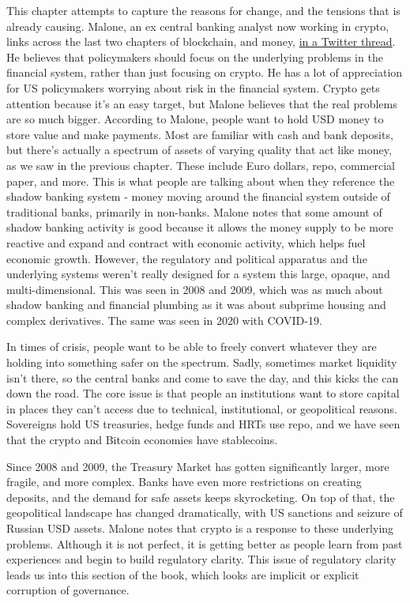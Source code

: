 This chapter attempts to capture the reasons for change, and the tensions that is already causing. Malone, an ex central banking analyst now working in crypto, links across the last two chapters of blockchain, and money, \href{https://twitter.com/brendanpmalone/status/1628067806984937472}{in a Twitter thread}. He believes that policymakers should focus on the underlying problems in the financial system, rather than just focusing on crypto. He has a lot of appreciation for US policymakers worrying about risk in the financial system. Crypto gets  attention because it's an easy target, but Malone believes that the real problems are so much bigger. According to Malone, people want to hold USD money to store value and make payments. Most are familiar with cash and bank deposits, but there's actually a spectrum of assets of varying quality that act like money, as we saw in the previous chapter. These include Euro dollars, repo, commercial paper, and more. This is what people are talking about when they reference the shadow banking system - money moving around the financial system outside of traditional banks, primarily in non-banks. Malone notes that some amount of shadow banking activity is good because it allows the money supply to be more reactive and expand and contract with economic activity, which helps fuel economic growth. However, the regulatory and political apparatus and the underlying systems weren't really designed for a system this large, opaque, and multi-dimensional. This was seen in 2008 and 2009, which was as much about shadow banking and financial plumbing as it was about subprime housing and complex derivatives. The same was seen in 2020 with COVID-19.\par
In times of crisis, people want to be able to freely convert whatever they are holding into something safer on the spectrum. Sadly, sometimes market liquidity isn't there, so the central banks and come to save the day, and this kicks the can down the road. The core issue is that people an institutions want to store capital in places they can't access due to technical, institutional, or geopolitical reasons. Sovereigns hold US treasuries, hedge funds and HRTs use repo, and we have seen that the crypto and Bitcoin economies have stablecoins.\par
Since 2008 and 2009, the Treasury Market has gotten significantly larger, more fragile, and more complex. Banks have even more restrictions on creating deposits, and the demand for safe assets keeps skyrocketing. On top of that, the geopolitical landscape has changed dramatically, with US sanctions and seizure of Russian USD assets. Malone notes that crypto is a response to these underlying problems. Although it is not perfect, it is getting better as people learn from past experiences and begin to build regulatory clarity. This issue of regulatory clarity leads us into this section of the book, which looks are implicit or explicit corruption of governance.\

